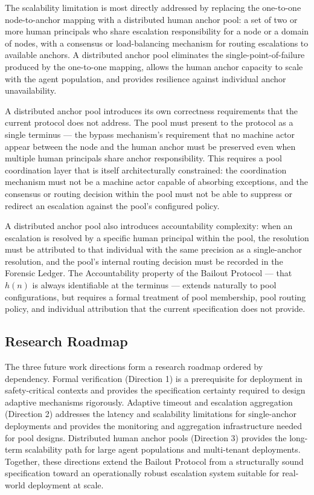 The scalability limitation is most directly addressed by replacing the one-to-one node-to-anchor mapping with a distributed human anchor pool: a set of two or more human principals who share escalation responsibility for a node or a domain of nodes, with a consensus or load-balancing mechanism for routing escalations to available anchors. A distributed anchor pool eliminates the single-point-of-failure produced by the one-to-one mapping, allows the human anchor capacity to scale with the agent population, and provides resilience against individual anchor unavailability.

A distributed anchor pool introduces its own correctness requirements that the current protocol does not address. The pool must present to the protocol as a single terminus --- the bypass mechanism's requirement that no machine actor appear between the node and the human anchor must be preserved even when multiple human principals share anchor responsibility. This requires a pool coordination layer that is itself architecturally constrained: the coordination mechanism must not be a machine actor capable of absorbing exceptions, and the consensus or routing decision within the pool must not be able to suppress or redirect an escalation against the pool's configured policy.

A distributed anchor pool also introduces accountability complexity: when an escalation is resolved by a specific human principal within the pool, the resolution must be attributed to that individual with the same precision as a single-anchor resolution, and the pool's internal routing decision must be recorded in the Forensic Ledger. The Accountability property of the Bailout Protocol --- that $h(n)$ is always identifiable at the terminus --- extends naturally to pool configurations, but requires a formal treatment of pool membership, pool routing policy, and individual attribution that the current specification does not provide.

\subsection{Research Roadmap}

The three future work directions form a research roadmap ordered by dependency. Formal verification (Direction 1) is a prerequisite for deployment in safety-critical contexts and provides the specification certainty required to design adaptive mechanisms rigorously. Adaptive timeout and escalation aggregation (Direction 2) addresses the latency and scalability limitations for single-anchor deployments and provides the monitoring and aggregation infrastructure needed for pool designs. Distributed human anchor pools (Direction 3) provides the long-term scalability path for large agent populations and multi-tenant deployments. Together, these directions extend the Bailout Protocol from a structurally sound specification toward an operationally robust escalation system suitable for real-world deployment at scale.
